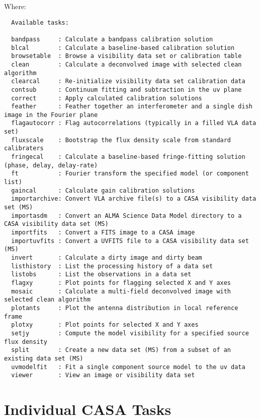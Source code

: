 Where:

\small
\begin{verbatim}
  Available tasks: 

  bandpass     : Calculate a bandpass calibration solution
  blcal        : Calculate a baseline-based calibration solution
  browsetable  : Browse a visibility data set or calibration table
  clean        : Calculate a deconvolved image with selected clean algorithm
  clearcal     : Re-initialize visibility data set calibration data
  contsub      : Continuum fitting and subtraction in the uv plane
  correct      : Apply calculated calibration solutions
  feather      : Feather together an interferometer and a single dish image in the Fourier plane
  flagautocorr : Flag autocorrelations (typically in a filled VLA data set)
  fluxscale    : Bootstrap the flux density scale from standard calibraters
  fringecal    : Calculate a baseline-based fringe-fitting solution (phase, delay, delay-rate)
  ft           : Fourier transform the specified model (or component list)
  gaincal      : Calculate gain calibration solutions
  importarchive: Convert VLA archive file(s) to a CASA visibility data set (MS)
  importasdm   : Convert an ALMA Science Data Model directory to a CASA visibility data set (MS)
  importfits   : Convert a FITS image to a CASA image
  importuvfits : Convert a UVFITS file to a CASA visibility data set (MS)
  invert       : Calculate a dirty image and dirty beam
  listhistory  : List the processing history of a data set
  listobs      : List the observations in a data set
  flagxy       : Plot points for flagging selected X and Y axes
  mosaic       : Calculate a multi-field deconvolved image with selected clean algorithm
  plotants     : Plot the antenna distribution in local reference frame
  plotxy       : Plot points for selected X and Y axes
  setjy        : Compute the model visibility for a specified source flux density
  split        : Create a new data set (MS) from a subset of an existing data set (MS)
  uvmodelfit   : Fit a single component source model to the uv data
  viewer       : View an image or visibility data set
\end{verbatim}
\normalsize

\section{Individual CASA Tasks}
\label{section:tasks.individual}

